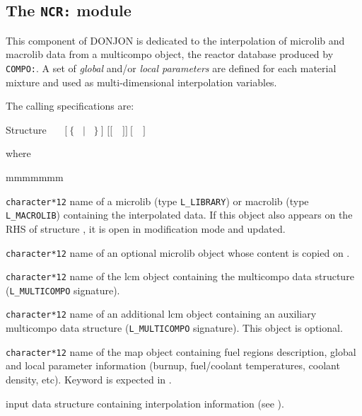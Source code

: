 \subsection{The {\tt NCR:} module}\label{sect:NCRData}

This component of DONJON is dedicated to the interpolation of {\sc microlib} and
{\sc macrolib} data from a {\sc multicompo} object, the reactor database produced by {\tt COMPO:}.
A set of {\sl global} and/or {\sl local parameters} are defined for each material mixture and
used as multi-dimensional interpolation variables.

\vskip 0.02cm

The calling specifications are:

\begin{DataStructure}{Structure }
~\moc{:=}~~$[~\{$~ $|$ ~$\}~]$  $[[$~~$]]~[$~~$]$~\moc{::}~ \\
\end{DataStructure}

\noindent where
\begin{ListeDeDescription}{mmmmmmm}

\item[\dusa{MLIB}] {\tt character*12} name of a {\sc microlib} (type {\tt L\_LIBRARY}) or {\sc macrolib} (type {\tt L\_MACROLIB}) containing the interpolated
data. If this object also appears on the RHS of structure , it is open in modification mode and updated.

\item[\dusa{MLIB2}] {\tt character*12} name of an optional {\sc microlib} object whose content is copied on .

\item[\dusa{CPONAM1}] {\tt character*12} name of the {\sc lcm} object containing the
{\sc multicompo} data structure ({\tt L\_MULTICOMPO} signature).

\item[\dusa{CPONAM2}] {\tt character*12} name of an additional {\sc lcm} object containing an auxiliary
{\sc multicompo} data structure ({\tt L\_MULTICOMPO} signature). This object is optional.

\item[\dusa{MAPFL}] {\tt character*12} name of the {\sc map} object containing fuel regions description, global and local parameter
information (burnup, fuel/coolant temperatures, coolant density, etc). Keyword  is expected in .

\item[\dusa{ncr\_data}] input data structure containing interpolation information (see ).

\end{ListeDeDescription}

